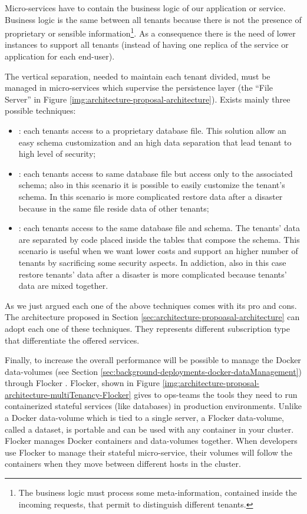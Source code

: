 Micro-services have to contain the business logic of our application or service. Business logic is
the same between all tenants because there is not the presence of proprietary or sensible information\footnote{
	The business logic must process some meta-information, contained inside the incoming requests, that permit to
	distinguish different tenants.}. As a consequence there is the need of lower instances to support all tenants
(instead of having one replica of the service or application for each end-user).

The vertical separation, needed to maintain each tenant divided, must be managed in micro-services
which supervise the persistence layer (the ``File Server'' in Figure
\ref{img:architecture-proposal-architecture}). Exists mainly three possible techniques:

\begin{itemize}
	\item{: each tenants access to a proprietary database file. This solution
		allow an easy schema customization and an high data separation that lead tenant to high level of security;}
	\item{: each tenants access to same database file but access
		only to the associated schema; also in this scenario it is possible to easily customize the tenant's schema.
		In this scenario is more complicated restore data after a disaster because in the same file reside data of
		other tenants;}
	\item{: each tenants access to the same database file and schema.
		The tenants' data are separated by code placed inside the tables that compose the schema. This scenario is
		useful when we want lower costs and support an higher number of tenants by sacrificing some security aspects.
		In addiction, also in this case restore tenants' data after a disaster is more complicated because tenants'
		data are mixed together.}
\end{itemize}

As we just argued each one of the above techniques comes with its pro and cons. The architecture
proposed in Section \ref{sec:architecture-propoasal-architecture} can adopt each one of these
techniques. They represents different subscription type that differentiate the offered services.

Finally, to increase the overall performance will be possible to manage the Docker data-volumes
(see Section \ref{sec:background-deployments-docker-dataManagement}) through Flocker \cite{flockerHomepage}.
Flocker, shown in Figure \ref{img:architecture-proposal-architecture-multiTenancy-Flocker} gives to
ops-teams the tools they need to run containerized stateful services (like databases) in production
environments. Unlike a Docker data-volume which is tied to a single server, a Flocker data-volume,
called a dataset, is portable and can be used with any container in your cluster. Flocker manages Docker
containers and data-volumes together. When developers use Flocker to manage their stateful micro-service,
their volumes will follow the containers when they move between different hosts in the cluster.

